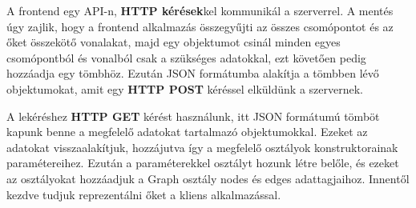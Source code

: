 A frontend egy API-n, \textbf{HTTP kérések}kel kommunikál a szerverrel. A mentés úgy zajlik, hogy a frontend alkalmazás összegyűjti az összes csomópontot és az őket összekötő vonalakat, majd egy objektumot csinál minden egyes csomópontból és vonalból csak a szükséges adatokkal, ezt követően pedig hozzáadja egy tömbhöz. Ezután JSON formátumba alakítja a tömbben lévő objektumokat, amit egy \textbf{HTTP POST} kéréssel elküldünk a szervernek.

A lekéréshez \textbf{HTTP GET} kérést használunk, itt JSON formátumú tömböt kapunk benne a megfelelő adatokat tartalmazó objektumokkal. Ezeket az adatokat visszaalakítjuk, hozzájutva így a megfelelő osztályok konstruktorainak paramétereihez. Ezután a paraméterekkel osztályt hozunk létre belőle, és ezeket az osztályokat hozzáadjuk a Graph osztály nodes és edges adattagjaihoz. Innentől kezdve tudjuk reprezentálni őket a kliens alkalmazással.